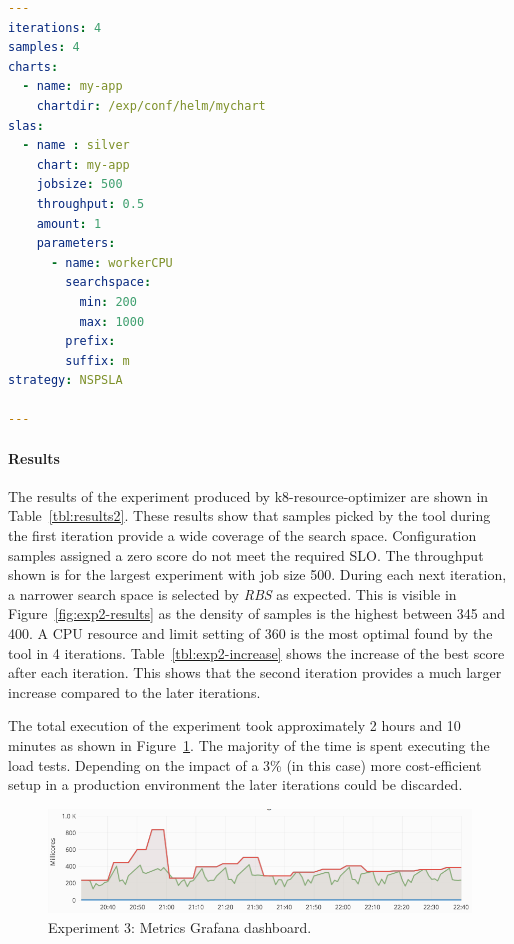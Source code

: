\begin{lstlisting}[caption=Experiment 3: Input configuration., language=yaml, label={lst:exp2-config}]
---
iterations: 4
samples: 4
charts:
  - name: my-app
    chartdir: /exp/conf/helm/mychart
slas:
  - name : silver
    chart: my-app
    jobsize: 500
    throughput: 0.5
    amount: 1
    parameters:
      - name: workerCPU
        searchspace:
          min: 200
          max: 1000
        prefix: 
        suffix: m
strategy: NSPSLA

---
\end{lstlisting}
\paragraph{Results}
The results of the experiment produced by k8-resource-optimizer are shown in Table~\ref{tbl:results2}. These results show that samples picked by the tool during the first iteration provide a wide coverage of the search space. Configuration samples assigned a zero score do not meet the required SLO. The throughput shown is for the largest experiment with job size 500. During each next iteration, a narrower search space is selected by \textit{RBS} as expected. This is visible in Figure~\ref{fig:exp2-results} as the density of samples is the highest between 345 and 400. A CPU resource and limit setting of 360 is the most optimal found by the tool in 4 iterations. Table~\ref{tbl:exp2-increase} shows the increase of the best score after each iteration. This shows that the second iteration provides a much larger increase compared to the later iterations. \\
\par 
\noindent The total execution of the experiment took approximately 2 hours and 10 minutes as shown in Figure~\ref{fig:exp2-grafana}. The majority of the time is spent executing the load tests. Depending on the impact of a 3\% (in this case) more cost-efficient setup in a production environment the later iterations could be discarded.


\begin{figure}[H]
    \centering
    \includegraphics[width=1\textwidth]{chapter-evaluation/single-sla-2-granfana.png}
    \caption{Experiment 3: Metrics Grafana dashboard. }
    \label{fig:exp2-grafana}
\end{figure}



